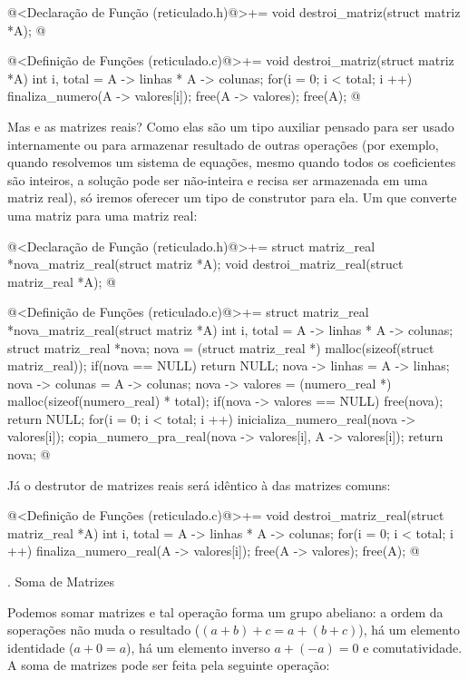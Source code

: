 \iniciocodigo
@<Declaração de Função (reticulado.h)@>+=
void destroi_matriz(struct matriz *A);
@
\fimcodigo

\iniciocodigo
@<Definição de Funções (reticulado.c)@>+=
void destroi_matriz(struct matriz *A){
  int i, total = A -> linhas * A -> colunas;
  for(i = 0; i < total; i ++){
    finaliza_numero(A -> valores[i]);
  }
  free(A -> valores);
  free(A);
}
@
\fimcodigo

Mas e as matrizes reais? Como elas são um tipo auxiliar pensado para
ser usado internamente ou para armazenar resultado de outras operações
(por exemplo, quando resolvemos um sistema de equações, mesmo quando
todos os coeficientes são inteiros, a solução pode ser não-inteira e
recisa ser armazenada em uma matriz real), só iremos oferecer um tipo
de construtor para ela. Um que converte uma matriz para uma matriz
real:

\iniciocodigo
@<Declaração de Função (reticulado.h)@>+=
struct matriz_real *nova_matriz_real(struct matriz *A);
void destroi_matriz_real(struct matriz_real *A);
@
\fimcodigo

\iniciocodigo
@<Definição de Funções (reticulado.c)@>+=
struct matriz_real *nova_matriz_real(struct matriz *A){
  int i, total = A -> linhas * A -> colunas;
  struct matriz_real *nova;
  nova = (struct matriz_real *) malloc(sizeof(struct matriz_real));
  if(nova == NULL)
    return NULL;
  nova -> linhas = A -> linhas;
  nova -> colunas = A -> colunas;
  nova -> valores = (numero_real *) malloc(sizeof(numero_real) * total);
  if(nova -> valores == NULL){
    free(nova);
    return NULL;
  }
  for(i = 0; i < total; i ++){
    inicializa_numero_real(nova -> valores[i]);
    copia_numero_pra_real(nova -> valores[i], A -> valores[i]);
  }
  return nova;
}
@
\fimcodigo

Já o destrutor de matrizes reais será idêntico à das matrizes comuns:

\iniciocodigo
@<Definição de Funções (reticulado.c)@>+=
void destroi_matriz_real(struct matriz_real *A){
  int i, total = A -> linhas * A -> colunas;
  for(i = 0; i < total; i ++){
    finaliza_numero_real(A -> valores[i]);
  }
  free(A -> valores);
  free(A);
}
@
\fimcodigo


{\tenbold{}. Soma de Matrizes}

Podemos somar matrizes e tal operação forma um grupo abeliano: a ordem
da soperações não muda o resultado ($(a+b)+c = a+(b+c)$), há um
elemento identidade ($a+0=a$), há um elemento inverso $a+(-a)=0$ e
comutatividade. A soma de matrizes pode ser feita pela seguinte
operação:

